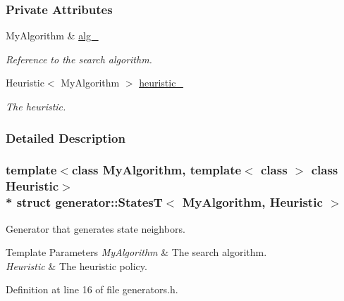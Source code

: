 \subsubsection*{Private Attributes}
\begin{DoxyCompactItemize}
\item 
My\+Algorithm \& \hyperlink{structgenerator_1_1StatesT_addb70c6e5c7d0a51bab02c567eecbf39}{alg\+\_\+}\hypertarget{structgenerator_1_1StatesT_addb70c6e5c7d0a51bab02c567eecbf39}{}\label{structgenerator_1_1StatesT_addb70c6e5c7d0a51bab02c567eecbf39}

\begin{DoxyCompactList}\small\item\em Reference to the search algorithm. \end{DoxyCompactList}\item 
Heuristic$<$ My\+Algorithm $>$ \hyperlink{structgenerator_1_1StatesT_acafc9caccc68dc2a4ae68b54d50db5b0}{heuristic\+\_\+}\hypertarget{structgenerator_1_1StatesT_acafc9caccc68dc2a4ae68b54d50db5b0}{}\label{structgenerator_1_1StatesT_acafc9caccc68dc2a4ae68b54d50db5b0}

\begin{DoxyCompactList}\small\item\em The heuristic. \end{DoxyCompactList}\end{DoxyCompactItemize}


\subsubsection{Detailed Description}
\subsubsection*{template$<$class My\+Algorithm, template$<$ class $>$ class Heuristic$>$\\*
struct generator\+::\+States\+T$<$ My\+Algorithm, Heuristic $>$}

Generator that generates state neighbors. 


\begin{DoxyTemplParams}{Template Parameters}
{\em My\+Algorithm} & The search algorithm. \\
\hline
{\em Heuristic} & The heuristic policy. \\
\hline
\end{DoxyTemplParams}


Definition at line 16 of file generators.\+h.



